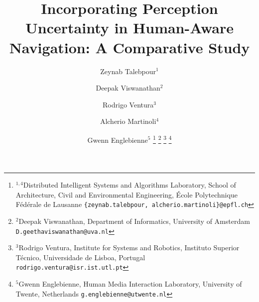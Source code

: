 \documentclass[letterpaper, 10 pt, conference]{ieeeconf}  %
\title{Incorporating Perception Uncertainty in Human-Aware Navigation: A Comparative Study}
\author{Zeynab Talebpour$^{1}$ \and Deepak Viswanathan$^{2}$ \and Rodrigo Ventura$^{3}$ \and Alcherio Martinoli$^{4}$ \and Gwenn Englebienne$^{5}$  %
\thanks{$^{1,4}$Distributed Intelligent Systems and Algorithms Laboratory,
School of Architecture, Civil and Environmental Engineering,
 \'Ecole Polytechnique F\'ed\'erale de Lausanne 
        {\tt\small \{zeynab.talebpour, alcherio.martinoli\}@epfl.ch}}%
\thanks{$^{2}$Deepak Viswanathan, Department of Informatics, University of Amsterdam
        {\tt\small D.geethaviswanathan@uva.nl}}%
\thanks{$^{3}$Rodrigo Ventura, Institute for Systems and Robotics, Instituto Superior T\'ecnico, Universidade de Lisboa, Portugal
        {\tt\small  rodrigo.ventura@isr.ist.utl.pt}}%
\thanks{$^{5}$Gwenn Englebienne, Human Media Interaction Laboratory, University of Twente, Netherlands
        {\tt\small g.englebienne@utwente.nl}}%
}
\begin{document}
\maketitle
\thispagestyle{empty}
\pagestyle{empty}


\begin{abstract}


\end{abstract}









%











\end{document}
